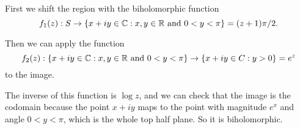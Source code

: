 \documentclass{homework}
\begin{document}
                                                                                                          \begin{solution}
                                                                                                          First we shift the region with the biholomorphic function 
                                                                                                          \[
                                                                                                          f_1(z):S\to \{ x + iy \in \mathbb{C} : x, y \in \mathbb{R} \mbox{ and } 0 < y < \pi \} =  (z+1)\pi/2.
                                                                                                          \]

                                                                                                          Then we can apply the function 
                                                                                                          \[
                                                                                                          f_2(z):  \{ x + iy \in \mathbb{C} : x, y \in \mathbb{R} \mbox{ and } 0 < y < \pi \} \to \{x+iy \in C: y > 0\} = e^{z}
                                                                                                          \]
                                                                                                          to the image.

                                                                                                          The inverse of this function is $\log z$, and we can check that the image is the codomain because the point $x+iy$ maps to the point with magnitude $e^x$ and angle $0<y<\pi$, which is the whole top half plane. So it is biholomorphic.


\end{solution}
\end{document}
